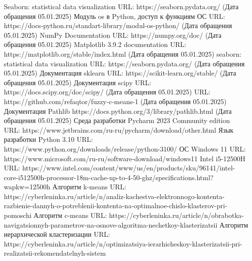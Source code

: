 \begin{thebibliography}{}
	Seaborn: statistical data visualization
	URL: https://seaborn.pydata.org/  (Дата обращения 05.01.2025)
	Модуль os в Python, доступ к функциям ОС
    URL: https://docs-python.ru/standart-library/modul-os-python/  (Дата обращения 05.01.2025)
	NumPy Documentation
    URL: https://numpy.org/doc/  (Дата обращения 05.01.2025)
	Matplotlib 3.9.2 documentation
    URL: https://matplotlib.org/stable/index.html  (Дата обращения 05.01.2025)
	seaborn: statistical data visualization
    URL: https://seaborn.pydata.org/  (Дата обращения 05.01.2025)
	Документация sklearn
    URL: https://scikit-learn.org/stable/  (Дата обращения 05.01.2025)
	Документация scipy
	URL: https://docs.scipy.org/doc/scipy/ (Дата обращения 05.01.2025)
	URL: https://github.com/refaqtor/fuzzy-c-means-1 (Дата обращения 05.01.2025)
	Документация Pathlib
	https://docs.python.org/3/library/pathlib.html  (Дата обращения 05.01.2025)
	Среда разработки Pycharm 2023 Community edition
	URL: https://www.jetbrains.com/ru-ru/pycharm/download/other.html
	Язык разработки Python 3.10
	URL: https://www.python.org/downloads/release/python-3100/
	ОС Windows 11
	URL: https://www.microsoft.com/ru-ru/software-download/windows11
	Intel i5-12500H
	URL: https://www.intel.com/content/www/us/en/products/sku/96141/intel-core-i512500h-processor-18m-cache-up-to-4-50-ghz/specifications.html?wapkw=12500h
	Алгоритм k-means
	URL: https://cyberleninka.ru/article/n/analiz-kachestva-elektronnogo-kontenta-razbienie-dannyh-o-potreblenii-kontenta-na-optimalnoe-chislo-klasterov-pri-pomoschi
	Алгоритм c-means
	URL: https://cyberleninka.ru/article/n/obrabotka-navigatsionnyh-parametrov-na-osnove-algoritma-nechetkoy-klasterizatsii
	Алгоритм иерархической кластеризации
	URL: https://cyberleninka.ru/article/n/optimizatsiya-ierarhicheskoy-klasterizatsii-pri-realizatsii-rekomendatelnyh-sistem
\end{thebibliography}